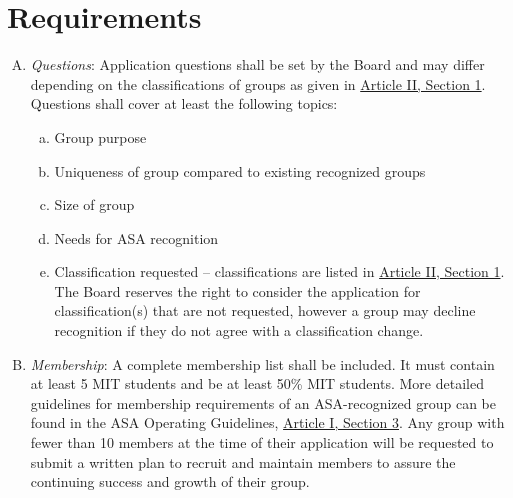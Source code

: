 \documentclass[12pt]{article}
\begin{document}
\section{Requirements}
\begin{enumerate}[A.]
    \item \textit{Questions}: Application questions shall be set by the Board and may differ depending on the
classifications of groups as given in \hyperref[art:II_sect1]{Article II, Section 1}. Questions shall cover at least the
following topics:
    \begin{enumerate}[a.]
        \item Group purpose
        \item Uniqueness of group compared to existing recognized groups
        \item Size of group
        \item Needs for ASA recognition
        \item Classification requested – classifications are listed in \hyperref[art:II_sect1]{Article II, Section 1}. The Board
reserves the right to consider the application for classification(s) that are not requested,
however a group may decline recognition if they do not agree with a classification change.
    \end{enumerate}

    \item \textit{Membership}: A complete membership list shall be included. It must contain at least 5 MIT
students and be at least 50\% MIT students. More detailed guidelines for membership
requirements of an ASA-recognized group can be found in the ASA Operating Guidelines, \hyperref[art:I_sect3]{Article I, Section 3}.
Any group with fewer than 10 members at the time of their application will be
requested to submit a written plan to recruit and maintain members to assure the continuing
success and growth of their group.


\end{enumerate}
\end{document}
